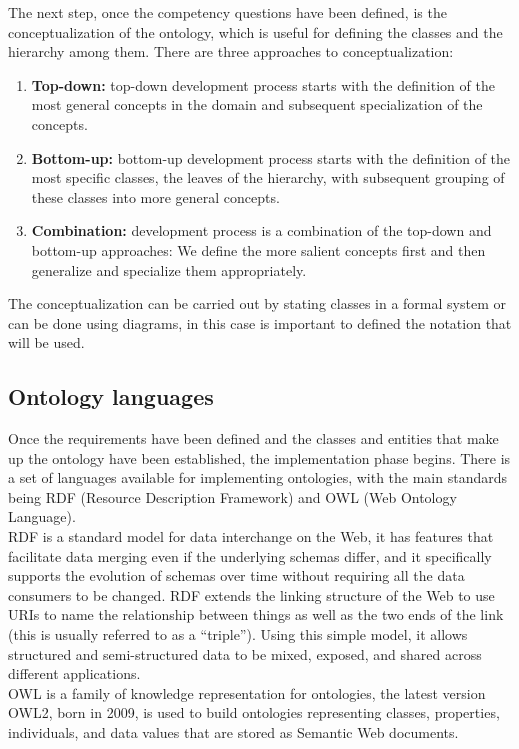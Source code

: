The next step, once the competency questions have been defined, is the conceptualization of the ontology, which is useful for defining the classes and the hierarchy among them. There are three approaches to conceptualization:
\begin{enumerate}
    \item \textbf{Top-down:} top-down development process starts with the definition of the most general concepts in the domain and subsequent specialization of the concepts.
    \item \textbf{Bottom-up:}  bottom-up development process starts with the definition of the most specific classes, the leaves of the hierarchy, with subsequent grouping of these classes into more general concepts.
    \item \textbf{Combination:} development process is a combination of the top-down and bottom-up approaches: We define the more salient concepts first and then generalize and specialize them appropriately.
\end{enumerate}
The conceptualization can be carried out by stating classes in a formal system or can be done using diagrams, in this case is important to defined the notation that will be used. 

\subsection{Ontology languages}
Once the requirements have been defined and the classes and entities that make up the ontology have been established, the implementation phase begins. There is a set of languages available for implementing ontologies, with the main standards being RDF (Resource Description Framework) and OWL (Web Ontology Language).\\
RDF is a standard model for data interchange on the Web, it  has features that facilitate data merging even if the underlying schemas differ, and it specifically supports the evolution of schemas over time without requiring all the data consumers to be changed. RDF extends the linking structure of the Web to use URIs to name the relationship between things as well as the two ends of the link (this is usually referred to as a “triple”). Using this simple model, it allows structured and semi-structured data to be mixed, exposed, and shared across different applications.\cite{rdf}\\ 
OWL is a family of knowledge representation for ontologies, the latest version OWL2, born in 2009, is used to build ontologies representing classes, properties, individuals, and data values that are stored as Semantic Web documents.\cite{owl2} %

